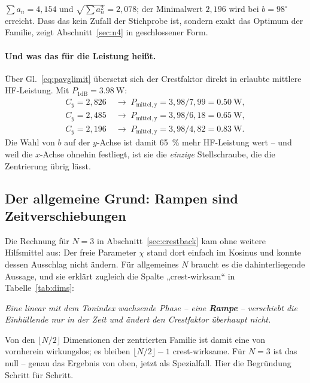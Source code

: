 \documentclass[11pt,a4paper]{article}
\newcommand{\crest}{\ensuremath{C}}
\begin{document}
\noindent$\sum a_n = 4{,}154$ und $\sqrt{\sum a_n^2}=2{,}078$; der
Minimalwert $2{,}196$ wird bei $b=98^\circ$ erreicht. Dass das kein Zufall der Stichprobe ist, sondern exakt das Optimum der Familie, zeigt Abschnitt~\ref{sec:n4} in geschlossener Form.

\paragraph{Und was das für die Leistung heißt.}
Über Gl.~\eqref{eq:pavglimit} übersetzt sich der Crestfaktor direkt in
erlaubte mittlere HF-Leistung. Mit $P_{1\mathrm{dB}}=\SI{3.98}{\watt}$:
\begin{align}
  \crest_y = 2{,}826 \;&\rightarrow\; P_\mathrm{mittel,y} = 3{,}98/7{,}99 = \SI{0.50}{\watt},\\
  \crest_y = 2{,}485 \;&\rightarrow\; P_\mathrm{mittel,y} = 3{,}98/6{,}18 = \SI{0.65}{\watt},\\
  \crest_y = 2{,}196 \;&\rightarrow\; P_\mathrm{mittel,y} = 3{,}98/4{,}82 = \SI{0.83}{\watt}.
\end{align}
Die Wahl von $b$ auf der $y$-Achse ist damit \SI{65}{\percent} mehr
HF-Leistung wert -- und weil die $x$-Achse ohnehin festliegt, ist sie die
\emph{einzige} Stellschraube, die die Zentrierung übrig lässt.

\subsection{Der allgemeine Grund: Rampen sind Zeitverschiebungen}
\label{sec:rampen}

Die Rechnung für $N=3$ in Abschnitt~\ref{sec:crestback} kam ohne weitere
Hilfsmittel aus: Der freie Parameter $\chi$ stand dort einfach im Kosinus und
konnte dessen Ausschlag nicht ändern. Für allgemeines $N$ braucht es die
dahinterliegende Aussage, und sie erklärt zugleich die Spalte
„crest-wirksam`` in Tabelle~\ref{tab:dims}:

\begin{center}
\emph{Eine linear mit dem Tonindex wachsende Phase -- eine \textbf{Rampe} --
verschiebt die Einhüllende nur in der Zeit und ändert den Crestfaktor
überhaupt nicht.}
\end{center}

\noindent Von den $\lfloor N/2\rfloor$ Dimensionen der zentrierten Familie
ist damit eine von vornherein wirkungslos; es bleiben
$\lfloor N/2\rfloor - 1$ crest-wirksame. Für $N=3$ ist das null -- genau das
Ergebnis von oben, jetzt als Spezialfall. Hier die Begründung Schritt für
Schritt.
\end{document}
